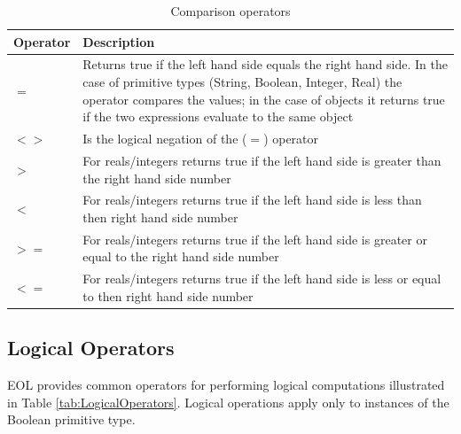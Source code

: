 \clearpage

\begin{longtabu} {|p{3.5cm}|X|}
			
			\caption{Comparison operators}
			\label{tab:ComparisonOperators}\\
			
			\hline
							
			\textbf{Operator} & \textbf{Description} \\\hline

			$=$ & Returns true if the left hand side equals the right hand side. In the case of primitive types (String, Boolean, Integer, Real) the operator compares the values; in the case of objects it returns true if the two expressions evaluate to the same object \\\hline
			
			$<>$ & Is the logical negation of the ($=$) operator \\\hline
				
			$>$ & For reals/integers returns true if the left hand side is greater than the right hand side number \\\hline
			
			$<$ & For reals/integers returns true if the left hand side is less than then right hand side number \\\hline
			
			$>=$ & For reals/integers returns true if the left hand side is greater or equal to the right hand side number \\\hline
			
			$<=$ & For reals/integers returns true if the left hand side is less or equal to then right hand side number \\\hline
		
\end{longtabu}

\subsection{Logical Operators}

EOL provides common operators for performing logical computations illustrated in Table \ref{tab:LogicalOperators}. Logical operations apply only to instances of the Boolean primitive type.


